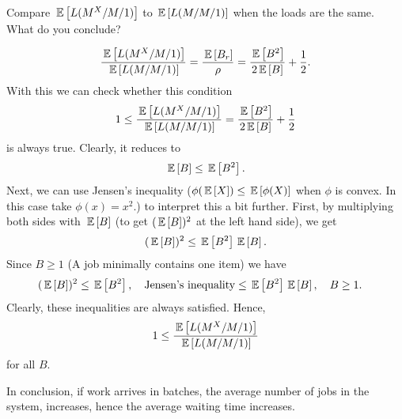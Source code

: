 \begin{question}
  Compare $\,\mathbb{E}\left[L(M^X/M/1)\right]$ to $\,\mathbb{E}\left[L(M/M/1)\right]$ when the loads are the
    same. What do you conclude?

  \begin{solution}
    \begin{equation*}
    \frac{\,\mathbb{E}\left[L(M^X/M/1)\right]}{\,\mathbb{E}\left[L(M/M/1)\right]} = \frac{\,\mathbb{E}\left[B_r\right]}{\rho} = 
\frac{\,\mathbb{E}\left[B^2\right]}{2\,\mathbb{E}\left[B\right]} + \frac 12.
    \end{equation*}
With this we can check whether this condition
    \begin{equation*}
    1\leq \frac{\,\mathbb{E}\left[L(M^X/M/1)\right]}{\,\mathbb{E}\left[L(M/M/1)\right]} = \frac{\,\mathbb{E}\left[B^2\right]}{2\,\mathbb{E}\left[B\right]} + \frac 12
    \end{equation*}
    is always true. Clearly, it reduces to
\begin{equation*}
\,\mathbb{E}\left[B\right] \leq  \,\mathbb{E}\left[B^2\right].
\end{equation*}
Next, we can use Jensen's inequality ($\phi(\,\mathbb{E}\left[X\right]) \leq \,\mathbb{E}\left[\phi(X)\right]$
when $\phi$ is convex. In this case take $\phi(x)=x^2$.) to interpret
this a bit further. First, by multiplying both sides with $\,\mathbb{E}\left[B\right]$ (to
get $(\,\mathbb{E}\left[B\right])^2$ at the left hand side), we get
\begin{equation*}
(\,\mathbb{E}\left[B\right])^2 \leq  \,\mathbb{E}\left[B^2\right] \,\mathbb{E}\left[B\right].
\end{equation*}
Since $B\geq 1$ (A job minimally contains one item) we have
\begin{equation*}
  \begin{split}
(\,\mathbb{E}\left[B\right])^2 
&\leq  \,\mathbb{E}\left[B^2\right], \quad{\text{Jensen's inequality}}
\leq   \,\mathbb{E}\left[B^2\right] \,\mathbb{E}\left[B\right], \quad{B \geq 1}.
  \end{split}
\end{equation*}
Clearly, these inequalities are always satisfied. Hence, 
    \begin{equation*}
    1\leq \frac{\,\mathbb{E}\left[L(M^X/M/1)\right]}{\,\mathbb{E}\left[L(M/M/1)\right]}
    \end{equation*}
for all $B$. 

In conclusion, if work arrives in batches, the average number of jobs
in the system, increases, hence the average waiting time increases.

  \end{solution}
\end{question}


